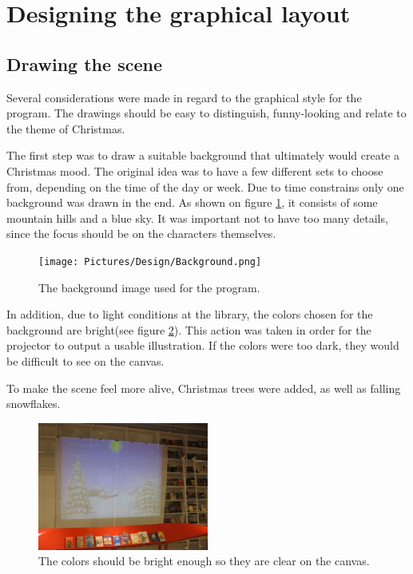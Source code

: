 \section{Designing the graphical layout}
\subsection{Drawing the scene}
Several considerations were made in regard to the graphical style for the program. The drawings should be easy to distinguish, funny-looking and relate to the theme of Christmas. 

The first step was to draw a suitable background that ultimately would create a Christmas mood. The original idea was to have a few different sets to choose from, depending on the time of the day or week. Due to time constrains only one background was drawn in the end. As shown on figure \ref{fig:ip_Background}, it consists of some mountain hills and a blue sky. It was important not to have too many details, since the focus should be on the characters themselves.

\begin{figure}[htbp]
\centering
\texttt{[image: Pictures/Design/Background.png]}
\caption{The background image used for the program.}
\label{fig:ip_Background}
\end{figure}

In addition, due to light conditions at the library, the colors chosen for the background are bright(see figure \ref{fig:background_projector}). This action was taken in order for the projector to output a usable illustration. If the colors were too dark, they would be difficult to see on the canvas.

To make the scene feel more alive, Christmas trees were added, as well as falling snowflakes.

\begin{figure}[htbp]
\centering
\includegraphics[width=0.50\textwidth]{Pictures/Design/background_projector}
\caption{The colors should be bright enough so they are clear on the canvas.}
\label{fig:background_projector}
\end{figure}

